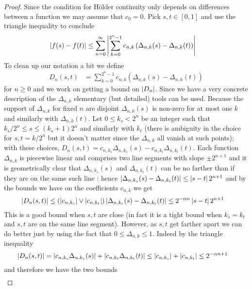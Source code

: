\begin{proof}
Since the condition for H\"older continuity only depends on
differences between a function we may assume that $c_0 = 0$.  Pick
$s,t \in [0,1]$ and use the triangle inequality to conclude 
\begin{align*}
\left \vert f(s) - f(t) \right \vert &\leq \sum_{n=0}^\infty \left \vert \sum_{k=0}^{2^n -1}
  c_{n,k} \left ( \Delta_{n,k}(s) - \Delta_{n,k}(t) \right)  \right \vert
\end{align*}
To clean up our notation a bit we define 
\begin{align*}
D_n(s,t) &= 
\sum_{k=0}^{2^n -1}  c_{n,k} \left ( \Delta_{n,k}(s) - \Delta_{n,k}(t) \right)
\end{align*}
for $n\geq 0$ and we work on getting a bound on $\left \vert D_n \right \vert$.  Since we have a very
concrete description of the $\Delta_{n,k}$ elementary (but detailed)
tools can be used.  Because the support of $\Delta_{n,k}$ for fixed
$n$ are disjoint $\Delta_{n,k}(s)$ is non-zero for at most one $k$ and
similarly with $\Delta_{n,k}(t)$.  Let $0 \leq k_s < 2^n$ be an
integer such that $k_s/2^{n} \leq s \leq (k_s+1)2^n$ and similarly with
$k_t$ (there is ambiguity in the choice for $s,t = k/2^n$ but it
doesn't matter since the $\Delta_{n,k}$ all vanish at such points);
with these choices, $D_n(s,t) = c_{n,k_s} \Delta_{n,k_s}(s) - c_{n, k_t}
  \Delta_{n,k_t}(t)$.  Each function $\Delta_{n,k}$ is
piecewise linear and comprises two line segments with slope $\pm
2^{n+1}$ and it is geometrically clear that $\Delta_{n,k_s}(s)$ and
$\Delta_{n,k_t}(t)$ can be no farther than if they are on the same
such line : hence $\left \vert \Delta_{n,k_s}(s) - \Delta_{n,k_t}(t) \right \vert \leq
\left \vert s-t \right \vert 2^{n+1}$ and by the bounds we have on the coefficients
$c_{n,k}$ we get
\begin{align*}
\left \vert D_n(s,t) \right \vert &\leq \left( \left \vert c_{n,k_s} \right \vert \vee \left \vert c_{n,k_t} \right \vert
\right) \left \vert \Delta_{n,k_s}(s) - \Delta_{n,k_t}(t) \right \vert  \leq 2^{-\alpha
  n} \left \vert s-t \right \vert 2^{n+1}
\end{align*}
This is a good bound when $s,t$ are close (in fact it is a tight bound
when $k_s=k_t$ and $s,t$ are on the same line segment).  However, as
$s,t$ get farther apart we can do better just by using the fact that
$0 \leq \Delta_{n,k} \leq 1$.  Indeed by the triangle inequality
\begin{align*}
\left \vert D_n(s,t) \right \vert &= \left \vert c_{n,k_s} \Delta_{n,k_s}(s) \right \vert + \left \vert c_{n,k_t}
  \Delta_{n,k_t}(t) \right \vert \leq \left \vert c_{n,k_s} \right \vert + \left \vert c_{n,k_t} \right \vert \leq
2^{-\alpha n + 1}
\end{align*}
and therefore we have the two bounds
\begin{align*}

\end{align*}
\end{proof}
